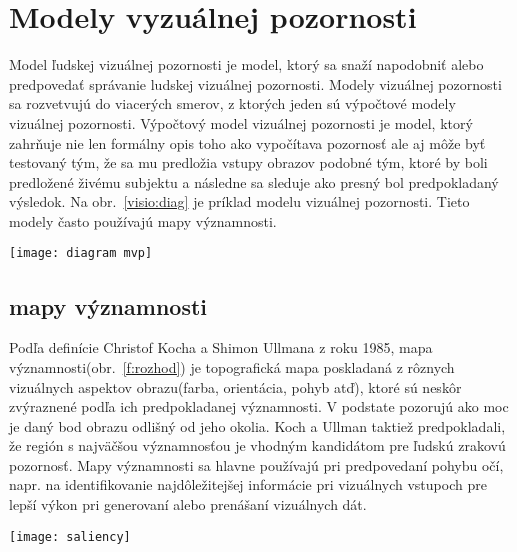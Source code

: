 \documentclass[10pt,twoside,slovak,a4paper]{article}
\begin{document}
\section{Modely vyzuálnej pozornosti} \label{1modely}
Model ľudskej vizuálnej pozornosti je model, ktorý sa snaží napodobniť alebo predpovedať správanie ludskej vizuálnej pozornosti. Modely vizuálnej pozornosti sa rozvetvujú do viacerých smerov, z ktorých jeden sú výpočtové modely vizuálnej pozornosti. Výpočtový model vizuálnej pozornosti je model, ktorý zahrňuje nie len formálny opis toho ako vypočítava pozornosť ale aj môže byť testovaný tým, že sa mu predložia vstupy obrazov podobné tým, ktoré by boli predložené živému subjektu a následne sa sleduje ako presný bol predpokladaný výsledok. Na obr.~\ref{visio:diag} je príklad modelu vizuálnej pozornosti. Tieto modely často používajú mapy významnosti.
\begin{figure*}[tbh]
\centering
\texttt{[image: diagram mvp]}
\caption{príklad modelu vizuálnej pozornosti, ktorý napodobňuje reakciu ľudského zraku na vizuálny podnet}
\label{visio:diag}
\end{figure*}
\subsection{mapy významnosti} \label{ina:nejake}
Podľa definície Christof Kocha a Shimon Ullmana z roku 1985, mapa významnosti(obr.~\ref{f:rozhod}) je topografická mapa poskladaná z rôznych vizuálnych aspektov obrazu(farba, orientácia, pohyb atď), ktoré sú neskôr zvýraznené podľa ich predpokladanej významnosti. V podstate pozorujú ako moc je daný bod obrazu odlišný od jeho okolia. Koch a Ullman taktiež predpokladali, že región s najväčšou významnosťou je vhodným kandidátom pre ľudskú zrakovú pozornosť. Mapy významnosti sa hlavne používajú pri predpovedaní pohybu očí, napr. na identifikovanie najdôležitejšej informácie pri vizuálnych vstupoch pre lepší výkon pri generovaní alebo prenášaní vizuálnych dát.%
\begin{figure*}[tbh]
\centering
\texttt{[image: saliency]}
\caption{Príklad mapy významnosti. Napravo je je vizuálny obraz a naľavo je jeho mapa významnosti.}
\label{f:rozhod}
\end{figure*}
\end{document}
